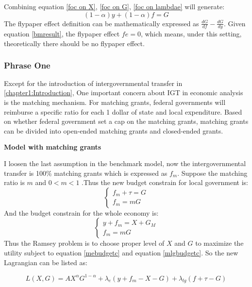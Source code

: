 Combining equation \ref{foc on X}, \ref{foc on G}, \ref{foc on lambdae} will generate:
\begin{equation}
    (1-\alpha)y+(1-\alpha)f=G \label{bmresult}
\end{equation}
The flypaper effect definition can be mathematically expressed as $\frac{d G}{d f}-\frac{d G}{d y}$. Given equation \ref{bmresult}, the flypaper effect $fe=0$, which means, under this setting, theoretically there should be no flypaper effect.
\subsubsection{Phrase One}
Except for the introduction of intergovernmental transfer in \ref*{chapter1:Introduction}, One important concern about IGT in economic analysis is the matching mechanism. For matching grants, federal governments will reimburse a specific ratio for each 1 dollar of state and local expenditure. Based on whether federal government set a cap on the matching grants, matching grants can be divided into open-ended matching grants and closed-ended grants.

\textbf{Model with matching grants}

I loosen the last assumption in the benchmark model, now the intergovernmental transfer is 100\% matching grants which is expressed as $f_m$. Suppose the matching ratio is $m$ and $0<m<1$  \label{mr}.Thus the new budget constrain for local government is:
\begin{equation}
    \left\{\begin{array}{l} \label{mlgbudgetc}
        f_m+\tau=G \\
        f_m=m G
    \end{array}\right.
\end{equation}
And the budget constrain for the whole economy is:
\begin{equation}
    \left\{\begin{array}{l} \label{mebudgetc}
        y+f_m=X+G_M \\
        f_m=m G
    \end{array}\right.
\end{equation}
Thus the Ramsey problem is to choose proper level of $X$ and $G$ to maximize the utility subject to equation \ref{mebudgetc} and equation \ref{mlgbudgetc}.
So the new Lagrangian can be listed as:

\begin{equation} \label{mlagrangian}
    L(X,G)=AX^{\alpha}G^{1-\alpha}+\lambda_{e}(y+f_m-X-G)+\lambda_{lg}(f+\tau-G)
\end{equation}

